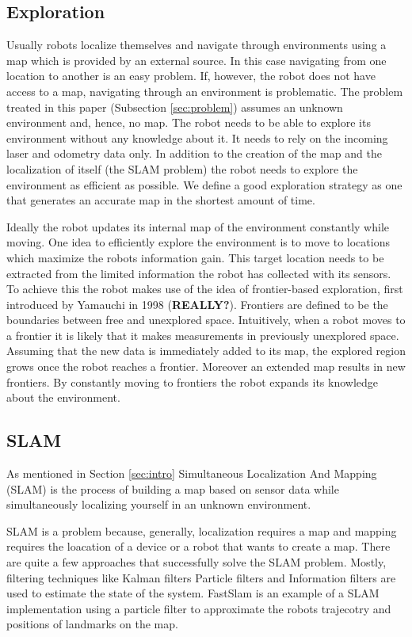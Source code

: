 \documentclass{ba-kecs}
\begin{document}
\subsection{Exploration}
\label{subsec:sotaExplore}
Usually robots localize themselves and navigate through environments using a map which is provided by an external source. In this case navigating from one location to another is an easy problem. If, however, the robot does not have access to a map, navigating through an environment is problematic. The problem treated in this paper (Subsection \ref{sec:problem}) assumes an unknown environment and, hence, no map. The robot needs to be able to explore its environment without any knowledge about it. It needs to rely on the incoming laser and odometry data only. In addition to the creation of the map and the localization of itself (the SLAM problem) the robot needs to explore the environment as efficient as possible. We define a good exploration strategy as one that generates an accurate map in the shortest amount of time.

Ideally the robot updates its internal map of the environment constantly while moving. One idea to efficiently explore the environment is to move to locations which maximize the robots information gain. This target location needs to be extracted from the limited information the robot has collected with its sensors.
To achieve this the robot makes use of the idea of frontier-based exploration, first introduced by Yamauchi \cite{Yamauchi} in 1998 (\textbf{REALLY?}). Frontiers are defined to be the boundaries between free and unexplored space. Intuitively, when a robot moves to a frontier it is likely that it makes measurements in previously unexplored space. Assuming that the new data is immediately added to its map, the explored region grows once the robot reaches a frontier. Moreover an extended map results in new frontiers. By constantly moving to frontiers the robot expands its knowledge about the environment.

\subsection{SLAM}
\label{subsec:sotaSlam}
As mentioned in Section \ref{sec:intro} Simultaneous Localization And Mapping (SLAM) is the process of building a map based on sensor data while simultaneously localizing yourself in an unknown environment.

SLAM is a problem because, generally, localization requires a map and mapping requires the loacation of a device or a robot that wants to create a map. There are quite a few approaches that successfully solve the SLAM problem. Mostly, filtering techniques like Kalman filters Particle filters and Information filters are used to estimate the state of the system. FastSlam \citep{Montemerlo02} is an example of a SLAM implementation using a particle filter to approximate the robots trajecotry and positions of landmarks on the map. 
\end{document}
